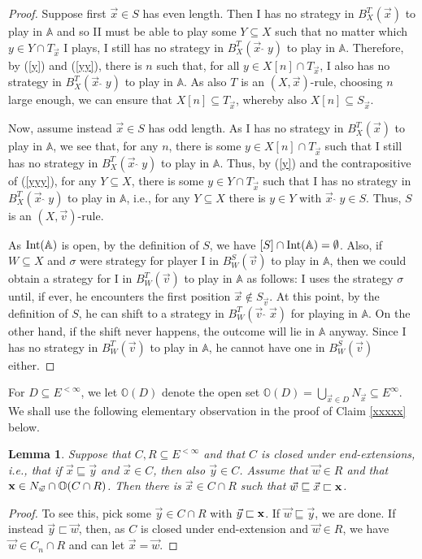 \documentclass[10pt]{amsart}
\newcommand {\A}{\mathbb A}
\newcommand {\OO}{\mathbb O}
\newcommand{\con}{\;\hat{}\;}
\newcommand{\tom} {\emptyset}
\newtheorem{lemme}[thm]{Lemma}
\theoremstyle{definition}
\begin{document}
\begin{proof}
Suppose first $\vec x\in S$  has  even length. Then I has no strategy in $B^T_X(\vec x)$ to play in $\A$ and so II must be able to play some $Y\subseteq X$ such that no matter which $y\in Y\cap T_{\vec x}$ I plays, I still has no  strategy in $B^T_X(\vec x\con y)$ to play in $\A$. Therefore, by (\ref{y}) and (\ref{yy}), there is $n$ such that, for all $y\in X[n]\cap T_{\vec x}$,  I also has no strategy in $B^T_X(\vec x\con y)$ to play in $\A$. As also $T$ is an $(X,\vec  x)$-rule, choosing  $n$ large enough, we can ensure that $X[n]\subseteq T_{\vec x}$, whereby also $X[n]\subseteq  S_{\vec x}$.

Now, assume instead $\vec x\in S$  has  odd length. As I has no strategy in $B^T_X(\vec x)$ to play in $\A$, we see that, for any $n$, there is some $y\in X[n]\cap T_{\vec x}$ such that  I still has no strategy in $B^T_X(\vec  x\con y)$ to play in $\A$. 
Thus, by (\ref{y}) and the contrapositive of (\ref{yyy}), for any $Y\subseteq X$, there is some $y\in Y\cap T_{\vec x}$ such that I has no strategy in $B^T_X(\vec x\con y)$ to play in $\A$, i.e., for any $Y\subseteq X$ there is $y\in Y$ with ${\vec x\con y}\in S$. 
Thus, $S$ is an $(X,\vec v)$-rule.




As ${\rm Int}(\A)$ is open, by the definition of $S$, we have  $ [S]\cap {\rm Int}(\A)=\tom$. Also, if $W\subseteq X$ and $\sigma$ were strategy for player I in $B_W^S(\vec v)$ to play in $\A$, then we could obtain a strategy for I in $B^T_W(\vec v)$ to play in $\A$ as follows: I uses the strategy $\sigma$ until, if ever, he encounters the first position $\vec x\notin S_{\vec v}$.  At this point, by the definition of $S$,  he can shift to a strategy in $B^T_W(\vec v\con \vec x)$ for playing in $\A$. On the other hand, if the shift never happens, the outcome will lie in $\A$ anyway. Since I has no strategy in $B^T_W(\vec v)$ to play in $\A$, he cannot have one in $B^S_W(\vec v)$ either.
\end{proof}



For $D\subseteq E^{<\infty}$, we let  $\OO(D)$ denote the open set $\OO(D)=\bigcup_{\vec x\in D}N_{\vec x}\subseteq E^\infty$. We shall use the following elementary observation in the proof of Claim \ref{xxxxx} below. 
\begin{lemme}\label{extensions}
Suppose that $C,R\subseteq E^{<\infty}$ and that $C$ is closed under end-extensions, i.e., that if $\vec x\sqsubseteq \vec y$ and $\vec x\in C$, then also $\vec y\in C$. Assume that $\vec w\in R$ and that ${\bf x}\in N_{\vec w}\cap \OO(C\cap R)$. Then there is $\vec x\in C\cap R$ such that $\vec w\sqsubseteq \vec x\sqsubset {\bf x}$. 
\end{lemme}
\begin{proof}To see this, pick some $\vec y\in C\cap R$ with $\vec y\sqsubset {\bf x}$. If $\vec w\sqsubseteq \vec y$, we are done. If instead $\vec y\sqsubset\vec w$, then, as $C$ is closed under end-extension and $\vec w\in R$, we have $\vec w\in C_n\cap R$ and can let $\vec x=\vec w$. 
\end{proof}
\end{document}
